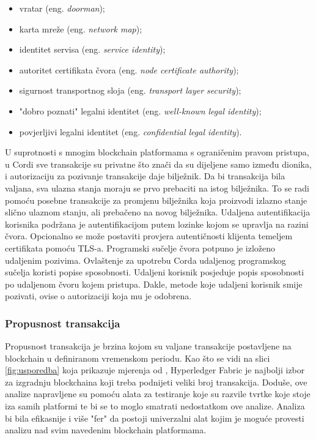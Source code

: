 \documentclass[times, utf8, diplomski]{fer}
\begin{document}
\begin{itemize}

\item vratar (eng.  \textit{doorman});

\item karta mreže (eng.  \textit{network map});

\item identitet servisa (eng. \textit{service identity});

\item autoritet certifikata čvora (eng.  \textit{node certificate authority});

\item sigurnost transportnog sloja (eng.  \textit{transport layer security});

\item "dobro poznati" legalni identitet (eng. \textit{well-known legal identity});

\item povjerljivi legalni identitet (eng.  \textit{confidential legal identity}).

\end{itemize}

U suprotnosti s mnogim blockchain platformama s ograničenim pravom pristupa, u Cordi sve transakcije su privatne što znači da su dijeljene samo između dionika, i autorizaciju za pozivanje transakcije daje bilježnik. Da bi transakcija bila valjana, sva ulazna stanja moraju se prvo prebaciti na istog bilježnika. To se radi pomoću posebne transakcije za promjenu bilježnika koja proizvodi izlazno stanje slično ulaznom stanju,  ali prebačeno na novog bilježnika. 
Udaljena autentifikacija korisnika podržana je autentifikacijom putem lozinke kojom se upravlja na razini čvora. Opcionalno se može postaviti provjera autentičnosti klijenta temeljem certifikata pomoću TLS-a. Programski sučelje čvora potpuno je izloženo udaljenim pozivima. Ovlaštenje za upotrebu Corda udaljenog programskog sučelja koristi popise sposobnosti. Udaljeni korisnik posjeduje popis sposobnosti po udaljenom čvoru kojem pristupa. Dakle, metode koje udaljeni korisnik smije pozivati, ovise o autorizaciji koja mu je odobrena.

\subsubsection{Propusnost transakcija}

Propusnost transakcija je brzina kojom su valjane transakcije postavljene na blockchain u definiranom vremenskom periodu. Kao što se vidi na slici \ref{fig:usporedba} koja prikazuje mjerenja od \citep{9411380}, Hyperledger Fabric je najbolji izbor za izgradnju blockchaina koji treba podnijeti veliki broj transakcija. Doduše, ove analize napravljene su pomoću alata za testiranje koje su razvile tvrtke koje stoje iza samih platformi te bi se to moglo smatrati nedostatkom ove analize. Analiza bi bila efikasnije i više "fer" da postoji univerzalni alat kojim je moguće provesti analizu nad svim navedenim blockchain platformama.
\end{document}
